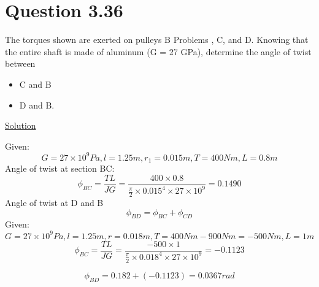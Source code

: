 \documentclass{article}
\begin{document}
\section*{Question 3.36}
The torques shown are exerted on pulleys B Problems , C, and D. Knowing that the entire shaft is made of aluminum (G = 27 GPa), determine the angle of twist between 
\begin{itemize}
 \item C and B
\item  D and B.
\end{itemize}
\begin{center}\underline{Solution}\end{center}
Given:  \[ G = 27\times10^{9}Pa, l = 1.25m, r_{1} = 0.015m, T = 400Nm, L = 0.8m\]
  Angle of twist at section BC:
\[\phi_{BC} = \frac{TL}{JG} = \frac{400\times0.8}{\frac{\pi}{2}\times0.015^{4}\times27\times10^{9}} = 0.1490\]
Angle of twist at D and B
\[\phi_{BD} = \phi_{BC} + \phi_{CD}\]
Given: 
 \[ G = 27\times10^{9}Pa, l = 1.25m, r = 0.018m, T = 400Nm - 900Nm = -500Nm , L = 1m\]
\[\phi_{BC} = \frac{TL}{JG} = \frac{-500\times1}{\frac{\pi}{2}\times0.018^{4}\times27\times10^{9}} = -0.1123\]

\[\phi_{BD} = 0.182 + (-0.1123) = 0.0367rad\]



\end{document}
